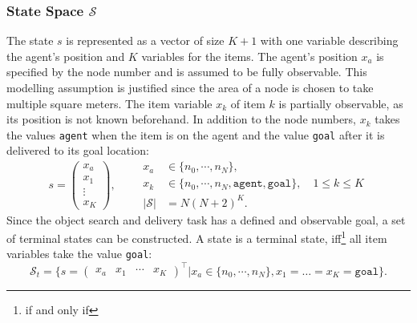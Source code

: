 \subsubsection{State Space $\mathcal{S}$}
The state $s$ is represented as a vector of size $K+1$ with one variable describing the agent's position and $K$ variables for the items. The agent's position $x_a$ is specified by the node number and is assumed to be fully observable. This modelling assumption is justified since the area of a node is chosen to take multiple square meters. The item variable $x_k$ of item $k$ is partially observable, as its position is not known beforehand. In addition to the node numbers, $x_k$ takes the values \texttt{agent} when the item is on the agent and the value \texttt{goal} after it is delivered to its goal location:
\begin{equation}
    s=\begin{pmatrix} x_a \\ x_1 \\ \vdots \\ x_K \end{pmatrix}, \qquad \begin{aligned} x_a&\in\{n_0, \cdots, n_N\},\\ 
    x_k &\in \{n_0, \cdots, n_N, \texttt{agent}, \texttt{goal}\}, \quad 1 \leq k \leq K \\
    |\mathcal{S}| &= N(N+2)^K. \end{aligned}
\end{equation}
Since the object search and delivery task has a defined and observable goal, a set of terminal states can be constructed. A state is a terminal state, iff\footnote{if and only if} all item variables take the value \texttt{goal}:
\begin{equation}\label{eq:s_t}
    \mathcal{S}_t = \{s=\begin{pmatrix} x_a & x_1 & \cdots & x_K \end{pmatrix}^\intercal | x_a\in \{n_0, \cdots, n_N\}, x_1=\ldots=x_K=\texttt{goal}\}.
\end{equation}
